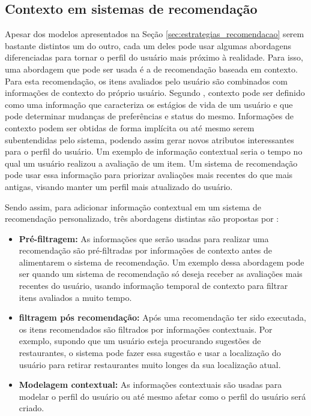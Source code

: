 \subsection{Contexto em sistemas de recomendação}

Apesar dos modelos apresentados na Seção \ref{sec:estrategias_recomendacao}
serem bastante distintos um do outro, cada um deles pode usar algumas
abordagens diferenciadas para tornar o perfil do usuário mais próximo à
realidade. Para isso, uma abordagem que pode ser usada é a de recomendação
baseada em contexto. Para esta recomendação, os itens avaliados pelo usuário são
combinados com informações de contexto do próprio usuário. Segundo ,
contexto pode ser definido como uma informação que caracteriza os estágios de
vida de um usuário e que pode determinar mudanças de preferências e status
do mesmo. Informações de contexto podem ser obtidas de forma implícita ou até
mesmo serem subentendidas pelo sistema, podendo assim gerar novos atributos
interessantes para o perfil do usuário. Um exemplo de informação contextual
seria o tempo no qual um usuário realizou a avaliação de um item. Um sistema de
recomendação pode usar essa informação para priorizar avaliações mais recentes
do que mais antigas, visando manter um perfil mais atualizado do usuário.

Sendo assim, para adicionar informação contextual em um sistema de recomendação
personalizado, três abordagens distintas são propostas por
:

\begin{itemize}
    \item \textbf{Pré-filtragem: } As informações que serão usadas
        para realizar uma recomendação são pré-filtradas por informações de
        contexto antes de alimentarem o sistema de recomendação. Um exemplo
        dessa abordagem pode ser quando um sistema de recomendação só deseja
        receber as avaliações mais recentes do usuário, usando informação
        temporal de contexto para filtrar itens avaliados a muito tempo.
    \item \textbf{filtragem pós recomendação: } Após uma recomendação ter sido
        executada, os itens recomendados são filtrados por informações
        contextuais. Por exemplo, supondo que um usuário esteja procurando
        sugestões de restaurantes, o sistema pode fazer essa sugestão e usar a
        localização do usuário para retirar restaurantes muito longes da sua
        localização atual.
    \item \textbf{Modelagem contextual: } As informações contextuais são usadas
        para modelar o perfil do usuário ou até mesmo afetar como o perfil do
        usuário será criado.
\end{itemize}

